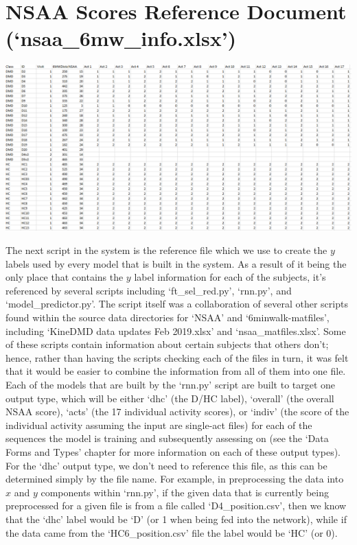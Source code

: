 \documentclass[12pt,twoside]{report}
\begin{document}
\section{NSAA Scores Reference Document (‘nsaa\_6mw\_info.xlsx’)}

\begin{center}
\includegraphics[scale=0.4]{project_figures/fig7_2}
\end{center}

\quad The next script in the system is the reference file which we use to create the $y$ labels used by every model that is built in the system. As a result of it being the only place that contains the $y$ label information for each of the subjects, it’s referenced by several scripts including ‘ft\_sel\_red.py’, ‘rnn.py’, and ‘model\_predictor.py’. The script itself was a collaboration of several other scripts found within the source data directories for ‘NSAA’ and ‘6minwalk-matfiles’, including ‘KineDMD data updates Feb 2019.xlsx’ and ‘nsaa\_matfiles.xlsx’. Some of these scripts contain information about certain subjects that others don’t; hence, rather than having the scripts checking each of the files in turn, it was felt that it would be easier to combine the information from all of them into one file.\\

\quad Each of the models that are built by the ‘rnn.py’ script are built to target one output type, which will be either ‘dhc’ (the D/HC label), ‘overall’ (the overall NSAA score), ‘acts’ (the 17 individual activity scores), or ‘indiv’ (the score of the individual activity assuming the input are single-act files) for each of the sequences the model is training and subsequently assessing on (see the ‘Data Forms and Types’ chapter for more information on each of these output types). For the ‘dhc’ output type, we don’t need to reference this file, as this can be determined simply by the file name. For example, in preprocessing the data into $x$ and $y$ components within ‘rnn.py’, if the given data that is currently being preprocessed for a given file is from a file called ‘D4\_position.csv’, then we know that the ‘dhc’ label would be ‘D’ (or 1 when being fed into the network), while if the data came from the ‘HC6\_position.csv’ file the label would be ‘HC’ (or 0).\\
\end{document}
